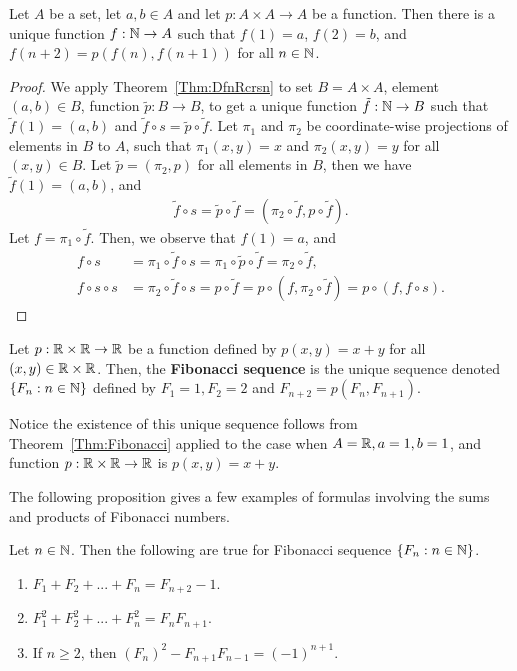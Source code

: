 \documentclass[a4paper,english,12pt]{article}
\begin{document}
\begin{thm}\label{Thm:Fibonacci} Let $A$ be a set, let $a, b \in A$ and let $p : A \times A \to A$ be a function. Then there is a unique function $f : \mathbb{N} \to A$ such that $f(1) = a$, $f(2) = b$, and $f(n + 2) = p(f(n), f(n + 1))$ for all $n \in \mathbb{N}$. 
\end{thm}
\begin{proof} We apply Theorem~\ref{Thm:DfnRcrsn} to set $B = A \times A$, element $(a,b) \in B$, function $\tilde{p}: B \to B$, to get a unique function $\tilde{f}: \mathbb{N} \to B$ such that $\tilde{f}(1) = (a,b)$ and $\tilde{f} \circ s = \tilde{p} \circ \tilde{f}$. Let $\pi_1$  and $\pi_2$ be coordinate-wise projections of elements in $B$ to $A$, such that $\pi_1(x,y) = x$ and $\pi_2(x,y) = y$ for all $(x,y) \in B$. %
Let $\tilde{p} = (\pi_2, p)$ for all elements in $B$, then we have $\tilde{f}(1) = (a,b)$, and 
\begin{align*}
\tilde{f} \circ s = \tilde{p} \circ \tilde{f} = (\pi_2 \circ \tilde{f},  p \circ \tilde{f}). 
\end{align*}
Let $f = \pi_1 \circ \tilde{f}$. Then, we observe that $f(1) = a$, and 
\begin{align*}
f \circ s &= \pi_1 \circ \tilde{f} \circ s = \pi_1 \circ \tilde{p} \circ \tilde{f} = \pi_2 \circ \tilde{f},\\
f \circ s \circ s &= \pi_2 \circ \tilde{f} \circ s = p \circ \tilde{f} = p \circ (f , \pi_2 \circ \tilde{f}) = p \circ (f , f \circ s).
\end{align*}
\end{proof}
\begin{defn} Let $p : \mathbb{R} \times \mathbb{R} \to \mathbb{R}$ be a function defined by $p(x,y)=x+y$ for all $(x,y)\in \mathbb{R} \times \mathbb{R}$. Then, the \textbf{Fibonacci sequence} is the unique sequence denoted $\{F_n : n \in \mathbb{N} \}$ defined by $F_1 = 1, F_2 = 2$ and $F_{n+2} = p(F_n, F_{n+1})$.
\end{defn}
\begin{rem} Notice the existence of this unique sequence follows from Theorem~\ref{Thm:Fibonacci} applied to the case when $A = \mathbb{R}, a = 1, b = 1$, and function $p : \mathbb{R} \times \mathbb{R} \to \mathbb{R}$ is $p(x,y) = x+y$.
\end{rem}
The following proposition gives a few examples of formulas involving the sums and products of Fibonacci numbers.
\begin{prop} Let $n \in \mathbb{N}$. Then the following are true for Fibonacci sequence $\{F_n: n \in \mathbb{N}\}$.
\begin{enumerate}
\item $F_1 + F_2 + . . . + F_n = F_{n+2} - 1$.
\item $F_1^2 + F_2^2 + . . . + F_n^2 = F_nF_{n+1}$.
\item If $n \geq 2$, then $(F_n)^2 - F_{n+1}F_{n-1}=(-1)^{n+1}$.
\end{enumerate}
\end{prop}
\end{document}
